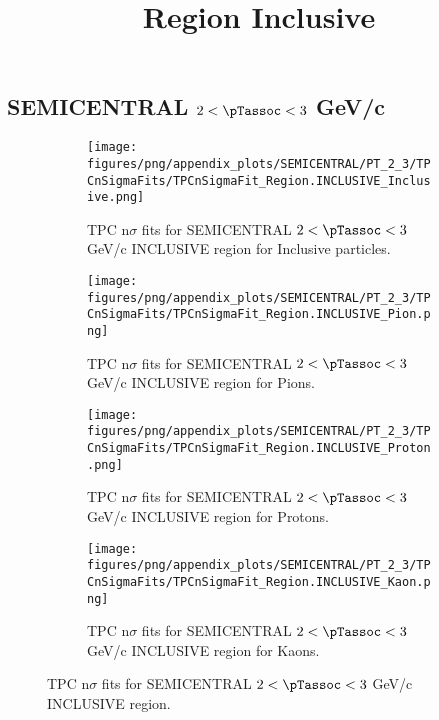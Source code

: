     
            \subsection*{SEMICENTRAL $2 < \pTassoc < 3$ GeV/c}
            \begin{figure}[H]
                \title{Region Inclusive}
                \begin{subfigure}[b]{0.5\textwidth}
                    \centering
                    \texttt{[image: figures/png/appendix\_plots/SEMICENTRAL/PT\_2\_3/TPCnSigmaFits/TPCnSigmaFit\_Region.INCLUSIVE\_Inclusive.png]}
                    \caption{TPC n$\sigma$ fits for SEMICENTRAL $2 < \pTassoc < 3$ GeV/c INCLUSIVE region for Inclusive particles.}
                    \label{fig:appendix_SEMICENTRAL_$2 < \pTassoc < 3$ GeV/c_INCLUSIVE_Inclusive}
                \end{subfigure}
                \begin{subfigure}[b]{0.5\textwidth}
                    \centering
                    \texttt{[image: figures/png/appendix\_plots/SEMICENTRAL/PT\_2\_3/TPCnSigmaFits/TPCnSigmaFit\_Region.INCLUSIVE\_Pion.png]}
                    \caption{TPC n$\sigma$ fits for SEMICENTRAL $2 < \pTassoc < 3$ GeV/c INCLUSIVE region for Pions.}
                    \label{fig:appendix_SEMICENTRAL_$2 < \pTassoc < 3$ GeV/c_INCLUSIVE_Pion}
                \end{subfigure}
                \begin{subfigure}[b]{0.5\textwidth}
                    \centering
                    \texttt{[image: figures/png/appendix\_plots/SEMICENTRAL/PT\_2\_3/TPCnSigmaFits/TPCnSigmaFit\_Region.INCLUSIVE\_Proton.png]}
                    \caption{TPC n$\sigma$ fits for SEMICENTRAL $2 < \pTassoc < 3$ GeV/c INCLUSIVE region for Protons.}
                    \label{fig:appendix_SEMICENTRAL_$2 < \pTassoc < 3$ GeV/c_INCLUSIVE_Proton}
                \end{subfigure}
                \begin{subfigure}[b]{0.5\textwidth}
                    \centering
                    \texttt{[image: figures/png/appendix\_plots/SEMICENTRAL/PT\_2\_3/TPCnSigmaFits/TPCnSigmaFit\_Region.INCLUSIVE\_Kaon.png]}
                    \caption{TPC n$\sigma$ fits for SEMICENTRAL $2 < \pTassoc < 3$ GeV/c INCLUSIVE region for Kaons.}
                    \label{fig:appendix_SEMICENTRAL_$2 < \pTassoc < 3$ GeV/c_INCLUSIVE_Kaon}
                \end{subfigure}
                \caption{TPC n$\sigma$ fits for SEMICENTRAL $2 < \pTassoc < 3$ GeV/c INCLUSIVE region.}
                \label{fig:appendix_SEMICENTRAL_$2 < \pTassoc < 3$ GeV/c_INCLUSIVE}
            \end{figure}
